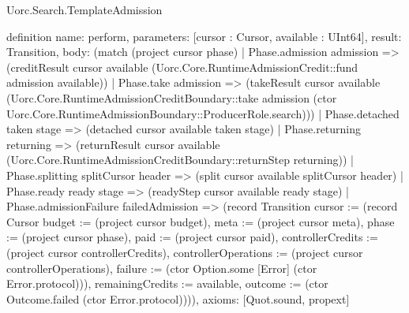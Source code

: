\begin{lexlean}{Uorc.Search.TemplateAdmission}
\begin{semanticmodule}
definition{
  name: perform,
  parameters: [cursor : Cursor, available : UInt64],
  result: Transition,
  body: (match (project cursor phase)
    | Phase.admission admission => (creditResult cursor available (Uorc.Core.RuntimeAdmissionCredit::fund admission available))
    | Phase.take admission => (takeResult cursor available (Uorc.Core.RuntimeAdmissionCreditBoundary::take admission (ctor Uorc.Core.RuntimeAdmissionBoundary::ProducerRole.search)))
    | Phase.detached taken stage => (detached cursor available taken stage)
    | Phase.returning returning => (returnResult cursor available (Uorc.Core.RuntimeAdmissionCreditBoundary::returnStep returning))
    | Phase.splitting splitCursor header => (split cursor available splitCursor header)
    | Phase.ready ready stage => (readyStep cursor available ready stage)
    | Phase.admissionFailure failedAdmission => (record Transition {cursor := (record Cursor {budget := (project cursor budget), meta := (project cursor meta), phase := (project cursor phase), paid := (project cursor paid), controllerCredits := (project cursor controllerCredits), controllerOperations := (project cursor controllerOperations), failure := (ctor Option.some [Error] (ctor Error.protocol))}), remainingCredits := available, outcome := (ctor Outcome.failed (ctor Error.protocol))})),
  axioms: [Quot.sound, propext]
}


\end{semanticmodule}
\end{lexlean}
